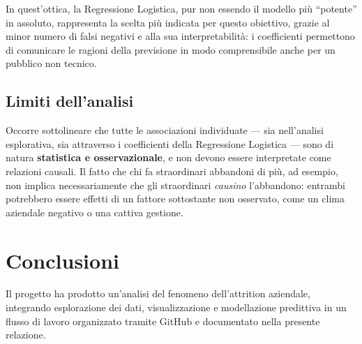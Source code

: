 \documentclass{article}
\begin{document}
\noindent In quest'ottica, la Regressione Logistica, pur non essendo il modello più ``potente''
in assoluto, rappresenta la scelta più indicata per questo obiettivo,
grazie al minor numero di falsi negativi e alla sua interpretabilità: i coefficienti permettono di comunicare le ragioni della previsione in modo comprensibile anche per un pubblico non tecnico.
 
\subsection{Limiti dell'analisi}
Occorre sottolineare che tutte le associazioni individuate --- sia nell'analisi esplorativa, sia attraverso i coefficienti della Regressione Logistica --- sono di natura \textbf{statistica e osservazionale}, e non devono essere interpretate come relazioni causali. Il fatto che chi fa straordinari abbandoni di più, ad esempio, non implica necessariamente che gli straordinari \emph{causino} l'abbandono: entrambi potrebbero essere effetti di un fattore sottostante non osservato, come un clima aziendale negativo o una cattiva gestione.

\newpage
\section{Conclusioni}
\label{sec:conclusioni}
Il progetto ha prodotto un'analisi del fenomeno dell'attrition
aziendale, integrando esplorazione dei dati, visualizzazione e modellazione predittiva
in un flusso di lavoro organizzato tramite GitHub e documentato nella presente relazione.
 
\end{document}
